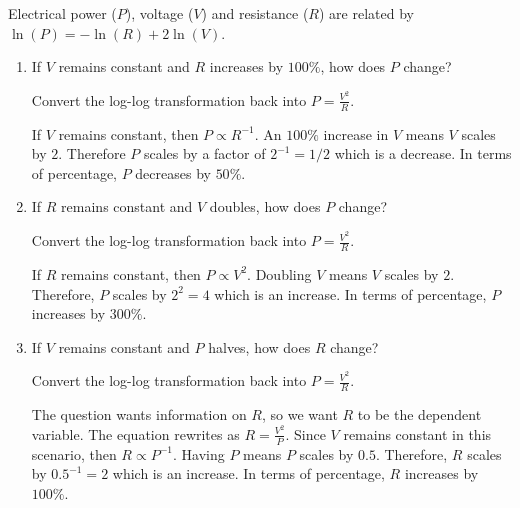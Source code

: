 \documentclass[../main.tex]{subfiles}
\begin{document}
\begin{exercise}
  Electrical power (\(P\)), voltage (\(V\)) and resistance (\(R\)) are related by \(\ln(P) = -\ln(R) + 2\ln(V)\). 
  \begin{enumerate}
    \item If \(V\) remains constant and \(R\) increases by \(100\%\), how does \(P\) change?

      \begin{solution}
        Convert the log-log transformation back into \(P = \frac{V^{2}}{R}\).

      If \(V\) remains constant, then \(P \propto R^{-1}\). An \(100\%\) increase in \(V\) means \(V\) scales by \(2\). Therefore \(P\) scales by a factor of \(2^{-1} = 1/2\) which is a decrease.  In terms of percentage, \(P\) decreases by \(50\%\).

      \end{solution}

    \item If \(R\) remains constant and \(V\) doubles, how does \(P\) change?

      \begin{solution}
        Convert the log-log transformation back into \(P = \frac{V^{2}}{R}\).

        If \(R\) remains constant, then \(P \propto V^{2}\). Doubling \(V\) means \(V\) scales by \(2\). Therefore, \(P\) scales by \(2^{2} = 4\) which is an increase.  In terms of percentage, \(P\) increases by \(300\%\).
      \end{solution}

      
    \item If \(V\) remains constant and \(P\) halves, how does \(R\) change?
      \begin{solution}
        Convert the log-log transformation back into \(P = \frac{V^{2}}{R}\).

        The question wants information on \(R\), so we want \(R\) to be the dependent variable.  The equation rewrites as \(R = \frac{V^{2}}{P}\). Since \(V\) remains constant in this scenario, then \(R \propto P^{-1}\). Having \(P\) means \(P\) scales by \(0.5\). Therefore, \(R\) scales by \(0.5^{-1} = 2\) which is an increase.  In terms of percentage, \(R\) increases by \(100\%\).

      \end{solution}
  \end{enumerate}
\end{exercise}
\end{document}
